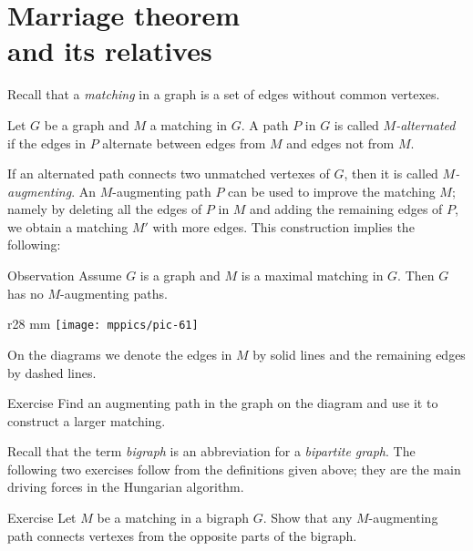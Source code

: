 \chapter[Marriage theorem and its relatives]{Marriage theorem\\ and its relatives}

Recall that a \emph{matching} in a graph is a set of edges without common vertexes. 

Let $G$ be a graph and $M$ a matching in $G$.
A path $P$ in $G$ is called \emph{$M$-alternated} if the edges in $P$ 
alternate between edges from $M$ and edges not from $M$.

If an alternated path connects two unmatched vertexes of $G$, then it is called \emph{$M$-augmenting}.
An $M$-augmenting path $P$ can be used to improve the matching $M$;
namely by deleting all the edges of $P$ in $M$
and adding the remaining edges of $P$, we obtain a matching $M'$ with more edges.
This construction implies the following:

\begin{thm}{Observation}\label{obs:augmenting}
Assume $G$ is a graph and $M$ is a maximal matching in $G$.
Then $G$ has no $M$-augmenting paths.
\end{thm} 

\begin{wrapfigure}[5]{r}{28 mm}
\vskip-4mm
\centering
\texttt{[image: mppics/pic-61]}
\vskip-0mm
\end{wrapfigure}

On the diagrams we denote the edges in $M$ by solid lines and the remaining edges by dashed lines.

\begin{thm}{Exercise}
Find an  augmenting path in the graph on the diagram
and use it to construct a larger matching.
\end{thm}


Recall that the term {}\emph{bigraph} is an abbreviation for a {}\emph{bipartite graph}.
The following two exercises follow from the definitions given above; 
they are the main driving forces in the Hungarian algorithm.


\begin{thm}{Exercise}
Let  $M$ be a matching in a bigraph $G$.
Show that any $M$-augmenting path connects vertexes from the opposite parts of the bigraph.
  
\end{thm}

